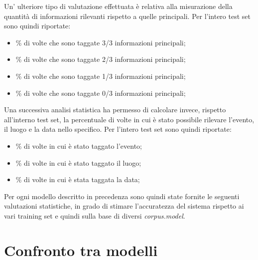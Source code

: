\documentclass[a4paper]{report}
\begin{document}
Un' ulteriore tipo di valutazione effettuata è relativa alla misurazione della quantità di informazioni rilevanti rispetto a quelle principali. Per l'intero test set sono quindi riportate:
\begin{itemize}
\item \% di volte che sono taggate 3/3 informazioni principali;
\item \% di volte che sono taggate 2/3 informazioni principali;
\item \% di volte che sono taggate 1/3 informazioni principali;
\item \% di volte che sono taggate 0/3 informazioni principali;
\end{itemize}
Una successiva analisi statistica ha permesso di calcolare invece, rispetto all'interno test set, la percentuale di volte in cui è stato possibile rilevare l'evento, il luogo e la data nello specifico. Per l'intero test set sono quindi riportate:
\begin{itemize}
\item \% di volte in cui è stato taggato l'evento;
\item \% di volte in cui è stato taggato il luogo;
\item \% di volte in cui è stata taggata la data;
\end{itemize}
Per ogni modello descritto in precedenza sono quindi state fornite le seguenti valutazioni statistiche, in grado di stimare l'accuratezza del sistema rispetto ai vari training set e quindi sulla base di diversi \textit{corpus.model}.

\section{Confronto tra modelli}
\end{document}
